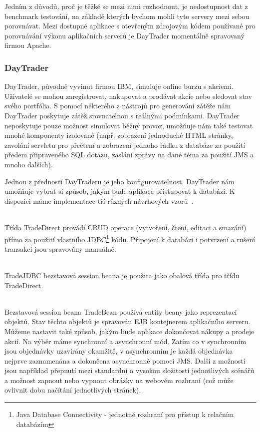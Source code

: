 \documentclass[122pt,oneside]{fithesis}
\begin{document}
Jedním z důvodů, proč je těžké se mezi nimi rozhodnout, je nedostupnost dat z benchmark testování, na základě kterých bychom mohli tyto servery mezi sebou porovnávat. Mezi dostupné aplikace s otevřeným zdrojovým kódem používané pro porovnávání výkonu aplikačních serverů je DayTrader momentálně spravovaný firmou Apache. 

\subsubsection{DayTrader}
DayTrader, původně vyvinut firmou IBM, simuluje online burzu s akciemi. Uživatelé se mohou zaregistrovat, nakupovat a prodávat akcie nebo sledovat stav svého portfólia. S pomocí některého z nástrojů pro generování zátěže nám DayTrader poskytuje zátěž srovnatelnou s reálnými podmínkami. DayTrader neposkytuje pouze možnost simulovat běžný provoz, umožňuje nám také testovat mnohé komponenty izolovaně (např. zobrazení jednoduché HTML stránky, zavolání servletu pro přečtení a zobrazení jednoho řádku z databáze za použití předem připraveného SQL dotazu, zaslání zprávy na dané téma za použití JMS a mnoho dalších). 

Jednou z předností DayTraderu je jeho konfigurovatelnost. DayTrader nám umožňuje vybrat si způsob, jakým bude aplikace přistupovat k databázi. K dispozici máme implementace tří různých návrhových vzorů~\cite{daytrader}.

\vspace{5 mm}
\\\indent Třída TradeDirect provádí CRUD operace (vytvoření, čtení, editaci a smazání) přímo za použití vlastního JDBC\footnote[1]{Java Database Connectivity - jednotné rozhraní pro přístup k relačním databázím} kódu. Připojení k databázi i potvrzení a rušení transakcí jsou spravovány manuálně.

\vspace{5 mm}
\\\indent TradeJDBC bezstavová session beana je použita jako obalová třída pro třídu TradeDirect.

\vspace{5 mm}
\\\indent Bezstavová session beana TradeBean používá entity beany jako reprezentaci objektů. Stav těchto objektů je spravován EJB kontejnerem aplikačního serveru.
\newline
\\\indent Můžeme nastavit také způsob, jakým bude aplikace dokončovat nákupy a prodeje akcií. Na výběr máme synchronní a asynchronní mód. Zatím co v synchronním jsou objednávky uzavírány okamžitě, v asynchronním je každá objednávka nejprve zaznamenána a dokončena asynchronně pomocí JMS. Další z možností jsou například přepnutí mezi standardní a vysokou složitostí jednotlivých scénářů a možnost zapnout nebo vypnout obrázky na webovém rozhraní (což může ovlivnit dobu načítání jednotlivých stránek).
\end{document}
